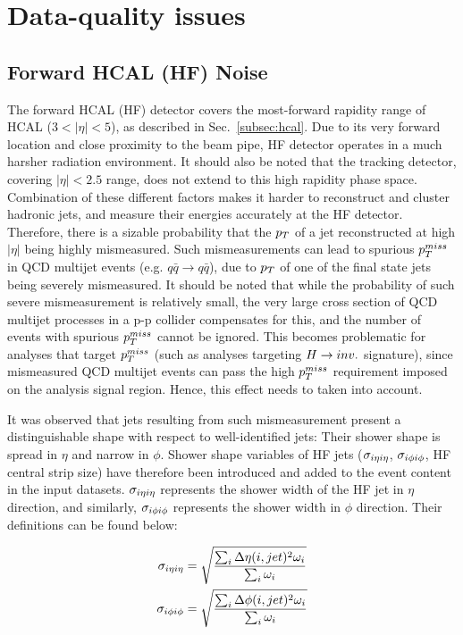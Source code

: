 \section{Data-quality issues}
\label{sec:dataquality}

\subsection{Forward HCAL (HF) Noise}
\label{subsec:hfnoise}

The forward HCAL (HF) detector covers the most-forward rapidity range of HCAL ($3 < |\eta| < 5$), as described in
Sec.~\ref{subsec:hcal}. Due to its very forward location and close proximity to the beam pipe, 
HF detector operates in a much harsher radiation environment. 
It should also be noted that the tracking detector, covering $|\eta| < 2.5$ range, does not extend to this high rapidity
phase space. Combination of these different factors makes it harder to reconstruct and cluster hadronic jets, 
and measure their energies accurately at the HF detector. Therefore, there
is a sizable probability that the $p_T$ of a jet reconstructed at high $|\eta|$ being highly mismeasured.
Such mismeasurements can lead to spurious $p_T^{miss}$ in QCD multijet events (e.g. $q\bar{q} \rightarrow q\bar{q}$),
due to $p_T$ of one of the final state jets being severely mismeasured. It should be noted that while the probability
of such severe mismeasurement is relatively small, the very large cross section of QCD multijet processes in a p-p collider
compensates for this, and the number of events with spurious $p_T^{miss}$ cannot be ignored.
This becomes problematic for analyses that target $p_T^{miss}$ (such as analyses targeting $H \rightarrow inv.$ signature), 
since mismeasured QCD multijet events can pass
the high $p_T^{miss}$ requirement imposed on the analysis signal region. Hence, this effect needs to taken into account. 

It was observed that jets resulting from such mismeasurement present a distinguishable shape with respect to well-identified jets: 
Their shower shape is spread in $\eta$ and narrow in $\phi$. Shower shape variables of HF jets ($\sigma_{i\eta i\eta}$, $\sigma_{i\phi i\phi}$, HF central strip size) 
have therefore been introduced and added to the event content in the input datasets. 
$\sigma_{i\eta i\eta}$ represents the shower width of the HF jet in $\eta$ direction, and similarly, $\sigma_{i\phi i\phi}$ represents the shower width in $\phi$ direction. 
Their definitions can be found below:

\begin{equation}
    \begin{split}
        \sigma_{i\eta i\eta} &= \sqrt{\frac{ \sum_{i} \Delta\eta(i, jet)^2 \omega_i }{ \sum_{i} \omega_i }} \\
        \sigma_{i\phi i\phi} &= \sqrt{\frac{ \sum_{i} \Delta\phi(i, jet)^2 \omega_i }{ \sum_{i} \omega_i }}
    \end{split}
    \label{eq:sieie_sipip}
\end{equation}

